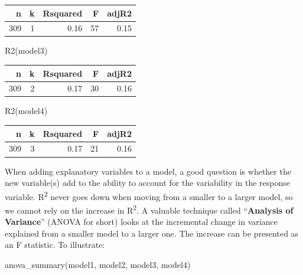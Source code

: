 \documentclass[
  letterpaper,
  DIV=11,
  numbers=noendperiod,
  oneside]{scrreprt}
\newenvironment{Shaded}{\begin{snugshade}}{\end{snugshade}}
\newcommand{\FunctionTok}[1]{\textcolor[rgb]{0.28,0.35,0.67}{#1}}
\newcommand{\NormalTok}[1]{\textcolor[rgb]{0.00,0.23,0.31}{#1}}
\begin{document}
\ttfamily 
\begin{tabular}{rrrrr}
\toprule
n & k & Rsquared & F & adjR2\\
\midrule
309 & 1 & 0.16 & 57 & 0.15\\
\bottomrule
\end{tabular} \normalfont
\bigskip

\begin{Shaded}
\begin{Highlighting}[]
\FunctionTok{R2}\NormalTok{(model3)}
\end{Highlighting}
\end{Shaded}

\ttfamily 
\begin{tabular}{rrrrr}
\toprule
n & k & Rsquared & F & adjR2\\
\midrule
309 & 2 & 0.17 & 30 & 0.16\\
\bottomrule
\end{tabular} \normalfont
\bigskip

\begin{Shaded}
\begin{Highlighting}[]
\FunctionTok{R2}\NormalTok{(model4)}
\end{Highlighting}
\end{Shaded}

\ttfamily 
\begin{tabular}{rrrrr}
\toprule
n & k & Rsquared & F & adjR2\\
\midrule
309 & 3 & 0.17 & 21 & 0.16\\
\bottomrule
\end{tabular} \normalfont
\bigskip

When adding explanatory variables to a model, a good question is whether
the new variable(s) add to the ability to account for the variability in
the response variable. R\textsuperscript{2} never goes down when moving
from a smaller to a larger model, so we cannot rely on the increase in
R\textsuperscript{2}. A valuable technique called ``\textbf{Analysis of
Variance}'' (ANOVA for short) looks at the incremental change in
variance explained from a smaller model to a larger one. The increase
can be presented as an F statistic. To illustrate:

\begin{Shaded}
\begin{Highlighting}[]
\FunctionTok{anova\_summary}\NormalTok{(model1, model2, model3, model4)}
\end{Highlighting}
\end{Shaded}
\end{document}
